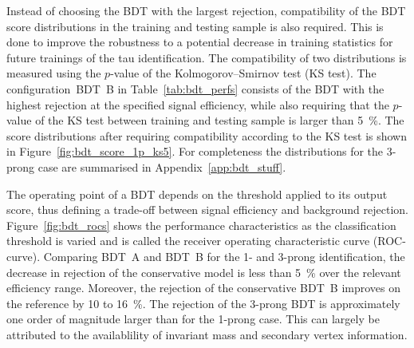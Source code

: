 Instead of choosing the BDT with the largest rejection, compatibility of the BDT
score distributions in the training and testing sample is also required. This is
done to improve the robustness to a potential decrease in training statistics
for future trainings of the tau identification. The compatibility of two
distributions is measured using the $p$-value of the Kolmogorov--Smirnov test
(KS test). The configuration~\mbox{BDT B} in Table~\ref{tab:bdt_perfs} consists
of the BDT with the highest rejection at the specified signal efficiency, while
also requiring that the $p$-value of the KS test between training and testing
sample is larger than \SI{5}{\percent}. The score distributions after requiring
compatibility according to the KS test is shown in
Figure~\ref{fig:bdt_score_1p_ks5}. For completeness the distributions for the
3-prong case are summarised in Appendix~\ref{app:bdt_stuff}.

The operating point of a BDT depends on the threshold applied to its output
score, thus defining a trade-off between signal efficiency and background
rejection. Figure~\ref{fig:bdt_rocs} shows the performance characteristics as
the classification threshold is varied and is called the receiver operating
characteristic curve (ROC-curve). Comparing \mbox{BDT A} and \mbox{BDT B} for
the 1- and 3-prong identification, the decrease in rejection of the conservative
model is less than \SI{5}{\percent} over the relevant efficiency range.
Moreover, the rejection of the conservative \mbox{BDT B} improves on the
reference by \num{10} to \SI{16}{\percent}. The rejection of the 3-prong BDT is
approximately one order of magnitude larger than for the 1-prong case. This can
largely be attributed to the availablility of invariant mass and secondary
vertex information.

